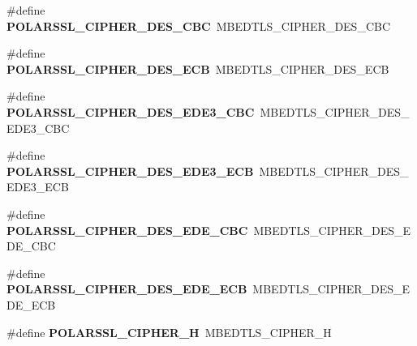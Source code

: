 \begin{DoxyCompactItemize}
\item 
\mbox{\label{compat-1_83_8h_a46037026b6211c370e465876ad9f7350}} 
\#define {\bfseries P\+O\+L\+A\+R\+S\+S\+L\+\_\+\+C\+I\+P\+H\+E\+R\+\_\+\+D\+E\+S\+\_\+\+C\+BC}~M\+B\+E\+D\+T\+L\+S\+\_\+\+C\+I\+P\+H\+E\+R\+\_\+\+D\+E\+S\+\_\+\+C\+BC
\item 
\mbox{\label{compat-1_83_8h_a0155d387c4dfe111901753a289070a46}} 
\#define {\bfseries P\+O\+L\+A\+R\+S\+S\+L\+\_\+\+C\+I\+P\+H\+E\+R\+\_\+\+D\+E\+S\+\_\+\+E\+CB}~M\+B\+E\+D\+T\+L\+S\+\_\+\+C\+I\+P\+H\+E\+R\+\_\+\+D\+E\+S\+\_\+\+E\+CB
\item 
\mbox{\label{compat-1_83_8h_aaf0fce6a45d4bdd675f86f49ef864181}} 
\#define {\bfseries P\+O\+L\+A\+R\+S\+S\+L\+\_\+\+C\+I\+P\+H\+E\+R\+\_\+\+D\+E\+S\+\_\+\+E\+D\+E3\+\_\+\+C\+BC}~M\+B\+E\+D\+T\+L\+S\+\_\+\+C\+I\+P\+H\+E\+R\+\_\+\+D\+E\+S\+\_\+\+E\+D\+E3\+\_\+\+C\+BC
\item 
\mbox{\label{compat-1_83_8h_afdcfab71dcba93b2dcbc859e22c917f1}} 
\#define {\bfseries P\+O\+L\+A\+R\+S\+S\+L\+\_\+\+C\+I\+P\+H\+E\+R\+\_\+\+D\+E\+S\+\_\+\+E\+D\+E3\+\_\+\+E\+CB}~M\+B\+E\+D\+T\+L\+S\+\_\+\+C\+I\+P\+H\+E\+R\+\_\+\+D\+E\+S\+\_\+\+E\+D\+E3\+\_\+\+E\+CB
\item 
\mbox{\label{compat-1_83_8h_acd1a9274490f8ef51072111d0b3475dc}} 
\#define {\bfseries P\+O\+L\+A\+R\+S\+S\+L\+\_\+\+C\+I\+P\+H\+E\+R\+\_\+\+D\+E\+S\+\_\+\+E\+D\+E\+\_\+\+C\+BC}~M\+B\+E\+D\+T\+L\+S\+\_\+\+C\+I\+P\+H\+E\+R\+\_\+\+D\+E\+S\+\_\+\+E\+D\+E\+\_\+\+C\+BC
\item 
\mbox{\label{compat-1_83_8h_adab9befbbf774e65707133a623ca98fc}} 
\#define {\bfseries P\+O\+L\+A\+R\+S\+S\+L\+\_\+\+C\+I\+P\+H\+E\+R\+\_\+\+D\+E\+S\+\_\+\+E\+D\+E\+\_\+\+E\+CB}~M\+B\+E\+D\+T\+L\+S\+\_\+\+C\+I\+P\+H\+E\+R\+\_\+\+D\+E\+S\+\_\+\+E\+D\+E\+\_\+\+E\+CB
\item 
\mbox{\label{compat-1_83_8h_a968de3b3b96f78eacd65b1b14b5a71f4}} 
\#define {\bfseries P\+O\+L\+A\+R\+S\+S\+L\+\_\+\+C\+I\+P\+H\+E\+R\+\_\+H}~M\+B\+E\+D\+T\+L\+S\+\_\+\+C\+I\+P\+H\+E\+R\+\_\+H
\item 
\mbox{\label{compat-1_83_8h_af9d769419a80eff1059f34941595cafc}} 

\end{DoxyCompactItemize}

